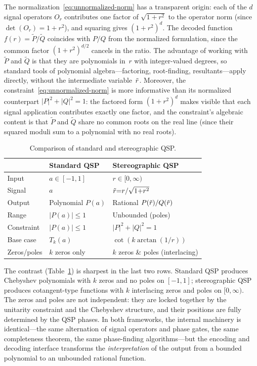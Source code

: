 The normalization~\eqref{eq:unnormalized-norm} has a
transparent origin: each of the $d$ signal operators $O_r$
contributes one factor of $\sqrt{1+r^2}$ to the operator norm
(since $\det(O_r) = 1+r^2$), and squaring gives $(1+r^2)^d$.
The decoded function $f(r) = \tilde{P}/\tilde{Q}$ coincides
with $P/Q$ from the normalized formulation, since the common
factor $(1+r^2)^{d/2}$ cancels in the ratio.  The advantage
of working with $\tilde{P}$ and $\tilde{Q}$ is that they are
polynomials in~$r$ with integer-valued degrees, so standard
tools of polynomial algebra---factoring, root-finding,
resultants---apply directly, without the intermediate
variable~$\tilde{r}$.  Moreover, the
constraint~\eqref{eq:unnormalized-norm} is more informative
than its normalized counterpart $|P|^2+|Q|^2=1$: the factored
form $(1+r^2)^d$ makes visible that each signal application
contributes exactly one factor, and the constraint's algebraic
content is that $\tilde{P}$ and $\tilde{Q}$ share no common
roots on the real line (since their squared moduli sum to a
polynomial with no real roots).

\begin{table}[t]
	\caption{Comparison of standard and stereographic QSP.}
	\label{tab:comparison}
	\begin{ruledtabular}
		\begin{tabular}{lll}
			            & Standard QSP      & Stereographic QSP                \\
			\hline
			Input       & $a \in [-1,1]$    & $r \in [0,\infty)$               \\
			Signal      & $a$               & $\tilde{r}{=}r/\sqrt{1{+}r^2}$     \\
			Output      & Polynomial $P(a)$ & Rational $P(\tilde{r})/Q(\tilde{r})$ \\
			Range       & $|P(a)| \leq 1$   & Unbounded (poles)                \\
			Constraint  & $|P(a)| \leq 1$   & $|P|^2{+}|Q|^2{=}1$              \\
			Base case   & $T_k(a)$          & $\cot(k\arctan(1/r))$            \\
			Zeros/poles & $k$ zeros only    & $k$ zeros \& poles (interlacing)
		\end{tabular}
	\end{ruledtabular}
\end{table}

The contrast (Table~\ref{tab:comparison}) is sharpest in the last two rows.  Standard QSP
produces Chebyshev polynomials with $k$ zeros and no poles on
$[-1,1]$; stereographic QSP produces cotangent-type functions
with $k$ interlacing zeros and poles on $[0,\infty)$.  The
zeros and poles are not independent: they are locked together
by the unitarity constraint and the Chebyshev structure, and
their positions are fully determined by the QSP phases.  In
both frameworks, the internal machinery is identical---the same
alternation of signal operators and phase gates, the same
completeness theorem, the same phase-finding algorithms---but
the encoding and decoding interface transforms the
\emph{interpretation} of the output from a bounded polynomial
to an unbounded rational function.


